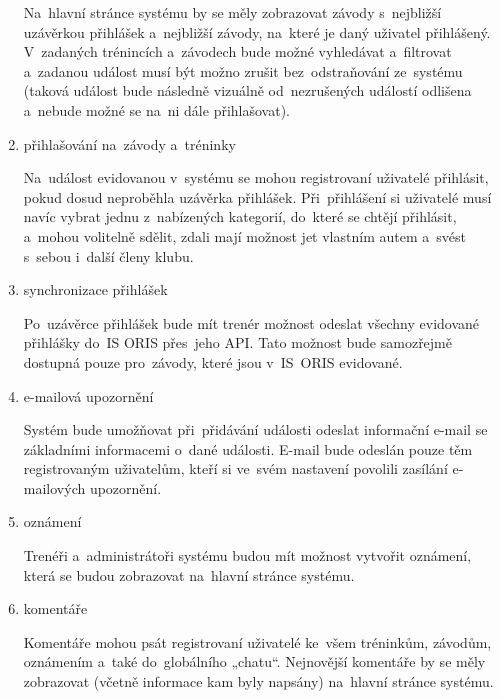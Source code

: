 \begin{enumerate}
Na~hlavní stránce systému by se měly zobrazovat závody s~nejbližší uzávěrkou přihlášek a~nejbližší závody, na~které je daný uživatel přihlášený. V~zadaných trénincích a~závodech bude možné vyhledávat a~filtrovat a~zadanou událost musí být možno zrušit bez~odstraňování ze~systému (taková událost bude následně vizuálně od~nezrušených událostí odlišena a~nebude možné se na~ni dále přihlašovat).

	\item přihlašování na~závody a~tréninky

Na~událost evidovanou v~systému se mohou registrovaní uživatelé přihlásit, pokud dosud neproběhla uzávěrka přihlášek. Při~přihlášení si uživatelé musí navíc vybrat jednu z~nabízených kategorií, do~které se chtějí přihlásit, a~mohou volitelně sdělit, zdali mají možnost jet vlastním autem a~svést s~sebou i~další členy klubu.

	\item synchronizace přihlášek

Po~uzávěrce přihlášek bude mít trenér možnost odeslat všechny evidované přihlášky do~IS ORIS přes~jeho API. Tato možnost bude samozřejmě dostupná pouze pro~závody, které jsou v~IS~ORIS evidované.

	\item e-mailová upozornění

Systém bude umožňovat při~přidávání události odeslat informační e-mail se základními informacemi o~dané události. E-mail bude odeslán pouze těm registrovaným uživatelům, kteří si ve~svém nastavení povolili zasílání e-mailových upozornění.

	\item oznámení

Trenéři a~administrátoři systému budou mít možnost vytvořit oznámení, která se budou zobrazovat na~hlavní stránce systému.

	\item komentáře

Komentáře mohou psát registrovaní uživatelé ke~všem tréninkům, závodům, oznámením a~také do~globálního „chatu“. Nejnovější komentáře by se měly zobrazovat (včetně informace kam byly napsány) na~hlavní stránce systému.
\end{enumerate}

